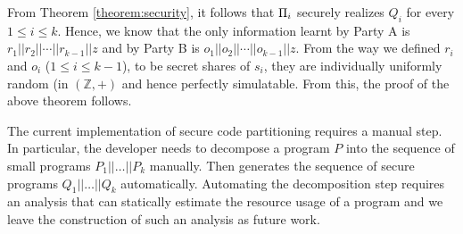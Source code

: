  From Theorem \ref{theorem:security}, it follows that $\Pi_i$ securely realizes $Q_i$ for every $1\leq i\leq k$. Hence, we know that the only information learnt by Party A is $r_1||r_2||\cdots||r_{k-1}||z$ and by Party B is $o_1||o_2||\cdots||o_{k-1}||z$. From the way we defined $r_i$ and $o_i$ ($1\leq i\leq k-1$), to be secret shares of $s_i$, they are individually uniformly random (in $(\mathbb{Z},+)$ and hence perfectly simulatable. From this, the proof of the above theorem follows. 

The current implementation of secure code partitioning requires a manual step.
In particular, the developer needs to decompose a program $P$ into 
the sequence of small programs $P_1||\ldots||P_k$ manually.
Then \tool generates the sequence of secure programs $Q_1||\ldots||Q_k$ automatically.
Automating the decomposition step requires an analysis that can 
statically estimate the resource usage of a \tool program and we leave the construction of such
an analysis as future work.